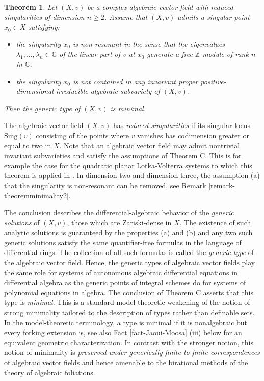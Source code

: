 \documentclass[12pt]{amsart}
\theoremstyle{definition}
\theoremstyle{plain}
\theoremstyle{exampstyle}
\newtheorem{thmx}{Theorem}
\theoremstyle{exampstyle}\newtheorem{thmxbis}{Theorem}
\numberwithin{equation}{section}
\theoremstyle{remark}
\begin{document}
\begin{thmx}
Let $(X,v)$ be a complex algebraic vector field with reduced singularities of dimension $n \geq 2$.  Assume that  $(X,v)$ admits a singular point $x_0 \in X$ satisfying:
\begin{itemize}
\item[(a)] the singularity $x_0$ is  {\em non-resonant} in the sense that the eigenvalues $\lambda_1,\ldots, \lambda_n \in \mathbb{C}$ of the linear part of $v$ at $x_0$ generate a free $\mathbb{Z}$-module of rank $n$ in $\mathbb{C}$,
\item[(b)]  the singularity $x_0$ is not contained in any {\em invariant} proper positive-dimensional irreducible algebraic subvariety of $(X,v)$.
\end{itemize}
Then the generic type of $(X,v)$ is minimal. 
\end{thmx} 

The algebraic vector field  $(X,v)$ has {\em reduced singularities} if its singular locus $\mathrm{Sing}(v)$ consisting of the points where $v$ vanishes has codimension greater or equal to two in $X$. Note that an algebraic vector field may admit nontrivial invariant subvarieties  and satisfy the assumptions of Theorem C. This is for example the case for the quadratic planar Lotka-Volterra systems to which this theorem is applied in \cite{DEJ}. In dimension two and dimension three, the assumption (a) that the singularity is non-resonant can be removed, see Remark \ref{remark-theoremminimality2}.

The conclusion describes the differential-algebraic behavior of the {\em generic solutions} of  $(X,v)$, those which are Zariski-dense in $X$. The existence of such analytic solutions is guaranteed by the properties (a) and (b) and any two such generic solutions satisfy the same quantifier-free formulas in the language of differential rings. The collection of all such formulas is called the {\em generic type} of the algebraic vector field. Hence, the generic types of algebraic vector fields play the same role for systems of autonomous algebraic differential equations in differential algebra as the generic points of integral schemes do for systems of polynomial equations in algebra.  The conclusion of Theorem C asserts that this type is {\em minimal}. This is a standard  model-theoretic weakening of the notion of strong minimality tailored to the description of types rather than definable sets. In the model-theoretic terminology, a type is minimal if it is nonalgebraic but every forking extension is, see also Fact \ref{fact-Jaoui-Moosa} (iii) below for an equivalent geometric characterization. In contrast with the stronger notion, this notion of minimality is {\em preserved under generically finite-to-finite correspondences} of algebraic vector fields and hence amenable to the birational methods of the theory of algebraic foliations.  
\end{document}
